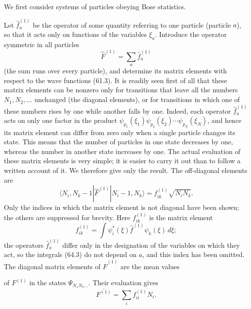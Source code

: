 

We first consider systems of particles obeying Bose statistics.

Let $\hat f_a^{(1)}$ be the operator of some quantity referring to one
particle (particle $a$), so that it acts only on functions of the variables
$\xi_a$. Introduce the operator symmetric in all particles
\begin{equation}
 \hat F^{(1)}=\sum_a\hat f_a^{(1)}
 \tag{64.1}
\end{equation}
(the sum runs over every particle), and determine its matrix elements with
respect to the wave functions (61.3). It is readily seen first of all that
these matrix elements can be nonzero only for transitions that leave all the
numbers $N_1,N_2,\ldots$ unchanged (the diagonal elements), or for transitions
in which one of these numbers rises by one while another falls by one. Indeed,
each operator $\hat f_a^{(1)}$ acts on only one factor in the product
$\psi_{p_1}(\xi_1)\psi_{p_2}(\xi_2)\cdots\psi_{p_N}(\xi_N)$, and hence its
matrix element can differ from zero only when a single particle changes its
state. This means that the number of particles in one state decreases by one,
whereas the number in another state increases by one. The actual evaluation
of these matrix elements is very simple; it is easier to carry it out than to
follow a written account of it. We therefore give only the result. The
off-diagonal elements are
\begin{equation}
 \langle N_i,N_k-1|\hat F^{(1)}|N_i-1,N_k\rangle
 =f_{ik}^{(1)}\sqrt{N_iN_k}.
 \tag{64.2}
\end{equation}
Only the indices in which the matrix element is not diagonal have been shown;
the others are suppressed for brevity. Here $f_{ik}^{(1)}$ is the matrix
element
\begin{equation}
 f_{ik}^{(1)}=\int\psi_i^*(\xi)\hat f^{(1)}\psi_k(\xi)\,d\xi;
 \tag{64.3}
\end{equation}
the operators $\hat f_a^{(1)}$ differ only in the designation of the variables
on which they act, so the integrals (64.3) do not depend on $a$, and this index
has been omitted. The diagonal matrix elements of $\hat F^{(1)}$ are the mean
values

of $F^{(1)}$ in the states $\Psi_{N_1N_2\ldots}$. Their evaluation gives
\begin{equation}
 \overline{F^{(1)}}=\sum_i f_{ii}^{(1)}N_i.
 \tag{64.4}
\end{equation}

